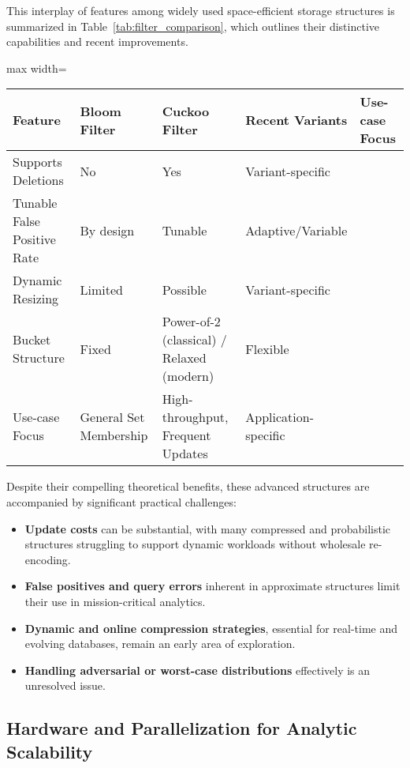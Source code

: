 \documentclass[sigconf]{acmart}
\begin{document}
This interplay of features among widely used space-efficient storage structures is summarized in Table~\ref{tab:filter_comparison}, which outlines their distinctive capabilities and recent improvements.

\begin{table*}[htbp]
\centering
\caption{Salient Features of Probabilistic and Compressed Storage Structures}
\label{tab:filter_comparison}
\begin{adjustbox}{max width=\textwidth}
\begin{tabular}{lllll}
\toprule
Feature & Bloom Filter & Cuckoo Filter & Recent Variants & Use-case Focus \\
\midrule
Supports Deletions & No & Yes & Variant-specific & \\
Tunable False Positive Rate & By design & Tunable & Adaptive/Variable & \\
Dynamic Resizing & Limited & Possible & Variant-specific & \\
Bucket Structure & Fixed & Power-of-2 (classical) / Relaxed (modern) & Flexible & \\
Use-case Focus & General Set Membership & High-throughput, Frequent Updates & Application-specific & \\
\bottomrule
\end{tabular}
\end{adjustbox}
\end{table*}

Despite their compelling theoretical benefits, these advanced structures are accompanied by significant practical challenges:
\begin{itemize}
    \item \textbf{Update costs} can be substantial, with many compressed and probabilistic structures struggling to support dynamic workloads without wholesale re-encoding.
    \item \textbf{False positives and query errors} inherent in approximate structures limit their use in mission-critical analytics.
    \item \textbf{Dynamic and online compression strategies}, essential for real-time and evolving databases, remain an early area of exploration.
    \item \textbf{Handling adversarial or worst-case distributions} effectively is an unresolved issue.
\end{itemize}

\subsection{Hardware and Parallelization for Analytic Scalability}
\end{document}
